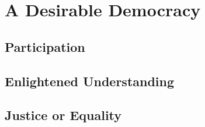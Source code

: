
\chapter[Desirable Democracy]{A Desirable Democracy} \label{chap:desirable-democracy}

\section{Participation}

\section{Enlightened Understanding}

\section{Justice or Equality}



 

